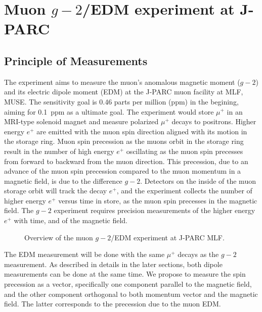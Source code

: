 \section{Muon $g-2$/EDM experiment at J-PARC}

\subsection{Principle of Measurements}\label{sec:Principle} 

The experiment aims to measure the muon's anomalous magnetic moment ($g-2$) 
and its electric dipole moment (EDM) at the J-PARC muon facility at MLF, MUSE.
The sensitivity goal is 0.46 parts per million (ppm) 
in the begining, aiming for 0.1~ppm as a ultimate goal.
The experiment would store $\mu^{+}$ in an MRI-type 
solenoid magnet and measure polarized $\mu^{+}$ decays to positrons.  
Higher energy $e^{+}$ are emitted with the muon spin direction 
aligned with its motion in the storage ring. Muon spin precession as 
the muons orbit in the storage ring result in the number of high energy 
$e^{+}$ oscillating as the muon spin precesses from forward to backward 
from the muon direction.  This precession, due to an advance of the 
muon spin precession compared to the muon momentum in a magnetic field, 
is due to the difference $g-2$.  Detectors on the inside 
of the muon storage orbit will track the decay
$e^{+}$, and the experiment collects the number of higher energy $e^{+}$ 
versus time in store, as the muon spin precesses in the magnetic field.
The $g-2$ experiment requires
precision measurements of the higher energy $e^{+}$ with time, and of the
magnetic field.

\begin{figure}[!hhh]
  \begin{center}
  \end{center}
  \caption{Overview of the muon $g-2$/EDM 
    experiment at J-PARC MLF. }
  \label{fig:g-2}
\end{figure}

The EDM measurement will be done with the same $\mu^{+}$ decays as the 
$g-2$ measurement. As described in details in the later sections, both 
dipole measurements can be done at the same time.
We propose to measure
the spin precession as a vector, specifically one component parallel
to the magnetic field, and the other component orthogonal to both
momentum vector and the magnetic field. The latter corresponds to 
the precession due to the muon EDM. 

